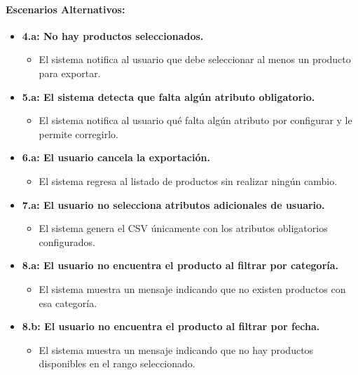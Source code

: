 \paragraph{Escenarios Alternativos:}
\begin{itemize}
    \item \textbf{4.a: No hay productos seleccionados.}
    \begin{itemize}
        \item El sistema notifica al usuario que debe seleccionar al menos un producto para exportar.
    \end{itemize}
    \item \textbf{5.a: El sistema detecta que falta algún atributo obligatorio.}
    \begin{itemize}
        \item El sistema notifica al usuario qué falta algún atributo por configurar y le permite corregirlo.
    \end{itemize}
    \item \textbf{6.a: El usuario cancela la exportación.}
    \begin{itemize}
        \item El sistema regresa al listado de productos sin realizar ningún cambio.
    \end{itemize}
    \item \textbf{7.a: El usuario no selecciona atributos adicionales de usuario.}
    \begin{itemize}
        \item El sistema genera el CSV únicamente con los atributos obligatorios configurados.
    \end{itemize}
    \item \textbf{8.a: El usuario no encuentra el producto al filtrar por categoría.}
    \begin{itemize}
        \item El sistema muestra un mensaje indicando que no existen productos con esa categoría.
    \end{itemize}
    \item \textbf{8.b: El usuario no encuentra el producto al filtrar por fecha.}
    \begin{itemize}
        \item El sistema muestra un mensaje indicando que no hay productos disponibles en el rango seleccionado.
    \end{itemize}
\end{itemize}


